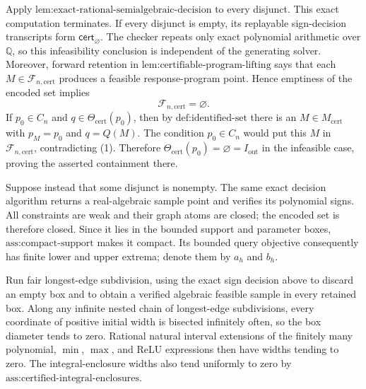 Apply \(\text{lem:exact-rational-semialgebraic-decision}\) to every disjunct.  This exact computation terminates.  If every disjunct is empty, its replayable sign-decision transcripts form \(\mathsf{cert}_{\varnothing}\).  The checker repeats only exact polynomial arithmetic over \(\mathbb Q\), so this infeasibility conclusion is independent of the generating solver.  Moreover, forward retention in \(\text{lem:certifiable-program-lifting}\) says that each \(M\in\mathcal F_{n,\mathrm{cert}}\) produces a feasible response-program point.  Hence emptiness of the encoded set implies
\[
\mathcal F_{n,\mathrm{cert}}=\varnothing. \tag{1}
\]
If \(p_0\in C_n\) and \(q\in\Theta_{\mathrm{cert}}(p_0)\), then by \(\text{def:identified-set}\) there is an \(M\in M_{\mathrm{cert}}\) with \(p_M=p_0\) and \(q=Q(M)\).  The condition \(p_0\in C_n\) would put this \(M\) in \(\mathcal F_{n,\mathrm{cert}}\), contradicting (1).  Therefore \(\Theta_{\mathrm{cert}}(p_0)=\varnothing=I_{\mathrm{out}}\) in the infeasible case, proving the asserted containment there.

Suppose instead that some disjunct is nonempty.  The same exact decision algorithm returns a real-algebraic sample point and verifies its polynomial signs.  All constraints are weak and their graph atoms are closed; the encoded set is therefore closed.  Since it lies in the bounded support and parameter boxes, \(\text{ass:compact-support}\) makes it compact.  Its bounded query objective consequently has finite lower and upper extrema; denote them by \(a_h\) and \(b_h\).

Run fair longest-edge subdivision, using the exact sign decision above to discard an empty box and to obtain a verified algebraic feasible sample in every retained box.  Along any infinite nested chain of longest-edge subdivisions, every coordinate of positive initial width is bisected infinitely often, so the box diameter tends to zero.  Rational natural interval extensions of the finitely many polynomial, \(\min\), \(\max\), and ReLU expressions then have widths tending to zero.  The integral-enclosure widths also tend uniformly to zero by \(\text{ass:certified-integral-enclosures}\).

